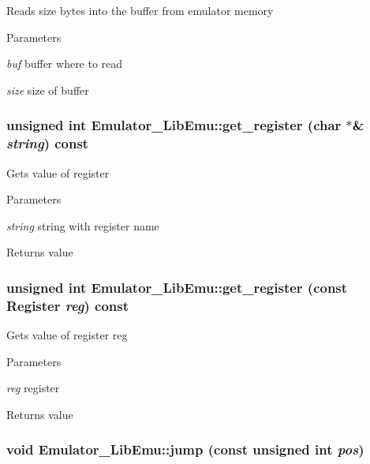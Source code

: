 \label{classEmulator__LibEmu_a8779c16bb5b588252c0d2d048c7954c5}
Reads size bytes into the buffer from emulator memory 
\begin{DoxyParams}{Parameters}
\item[{\em buf}]buffer where to read \item[{\em size}]size of buffer \end{DoxyParams}
\hypertarget{classEmulator__LibEmu_ad6f5f9fcfa552bf5865b6c9a432aa2ba}{
\subsubsection[{get\_\-register}]{\setlength{\rightskip}{0pt plus 5cm}unsigned int Emulator\_\-LibEmu::get\_\-register (char $\ast$\& {\em string}) const}}
\label{classEmulator__LibEmu_ad6f5f9fcfa552bf5865b6c9a432aa2ba}
Gets value of register 
\begin{DoxyParams}{Parameters}
\item[{\em string}]string with register name \end{DoxyParams}
\begin{DoxyReturn}{Returns}
value 
\end{DoxyReturn}
\hypertarget{classEmulator__LibEmu_a574c79f85662bee6c54bf32f0203baf5}{
\subsubsection[{get\_\-register}]{\setlength{\rightskip}{0pt plus 5cm}unsigned int Emulator\_\-LibEmu::get\_\-register (const Register {\em reg}) const}}
\label{classEmulator__LibEmu_a574c79f85662bee6c54bf32f0203baf5}
Gets value of register reg 
\begin{DoxyParams}{Parameters}
\item[{\em reg}]register \end{DoxyParams}
\begin{DoxyReturn}{Returns}
value 
\end{DoxyReturn}
\hypertarget{classEmulator__LibEmu_a998a8239af4107121592764094de152c}{
\subsubsection[{jump}]{\setlength{\rightskip}{0pt plus 5cm}void Emulator\_\-LibEmu::jump (const unsigned int {\em pos})}}
